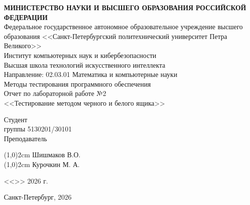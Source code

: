 \documentclass{article}[14pt]
\begin{document}
	
\thispagestyle{empty}
\begin{center}
	\Large {\bfseries МИНИСТЕРСТВО НАУКИ И ВЫСШЕГО ОБРАЗОВАНИЯ РОССИЙСКОЙ ФЕДЕРАЦИИ}
	\\
	\vspace{3mm}
	Федеральное государственное автономное образовательное учреждение высшего образования <<Санкт-Петербургский политехнический университет Петра Великого>>
	\\
	\vspace{3mm}
	Институт компьютерных наук и кибербезопасности
	\\
	\vspace{3mm}
	Высшая школа технологий искусственного интеллекта
	\\
	\vspace{3mm}
	Направление: 02.03.01 Математика и компьютерные науки
	\\
	\vspace{2cm}
	\large{
		Методы тестирования программного обеспечения}
	\\
	\LARGE{
		Отчет по лабораторной работе №2\\
		<<Тестирование методом черного и белого ящика>>}
\end{center}

\vspace{5.5cm}
\begin{flushleft}
	\Large
	Студент
	\\
	группы 5130201/30101
	\\
	\vspace{2cm}
	\Large
	Преподаватель
	\\ 
\end{flushleft}
\vspace{-4.6cm}
\begin{flushright}
	\Large
	\line(1,0){2cm}
	\hspace{0.4cm}
	Шишмаков В.О.
	\\
	\vspace{2,7cm}
	\hspace{2cm}
	\Large
	\line(1,0){2cm}
	\hspace{0.4cm}
	Курочкин М. А.
	\hspace{-0.1cm}
	
\end{flushright}

\vspace{1cm}
\hspace{9.8cm}
{
	\Large
	\vspace{0.8cm}
	<<\underline{\hspace{1cm}}>>\underline{\hspace{2.5cm}} 2026 г.
}
\hfill \break
\hfill \break
\hfill \break
\hfill \break
\begin{center} \large{Санкт-Петербург, 2026} \end{center}
\pagebreak
\end{document}

